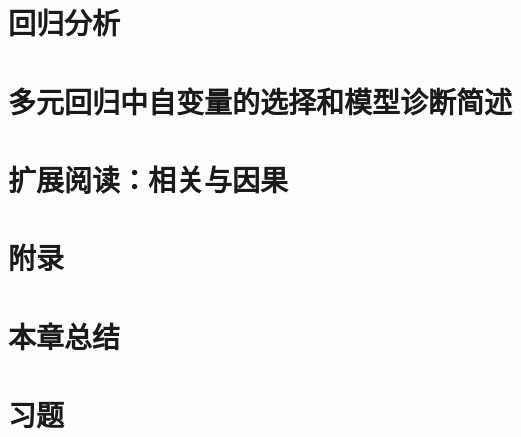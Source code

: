 \documentclass[UTF8,12pt,a4paper,fontset=fandol]{ctexbook}
\begin{document}
\section{回归分析}
\label{sec:study-regression}

\section{多元回归中自变量的选择和模型诊断简述}
\label{sec:study-regression-diagnostics}

\section{扩展阅读：相关与因果}
\label{sec:study-correlation-causation}

\section{附录}
\label{sec:study-regression-appendix}

\section*{本章总结}

\section*{习题}
\end{document}
